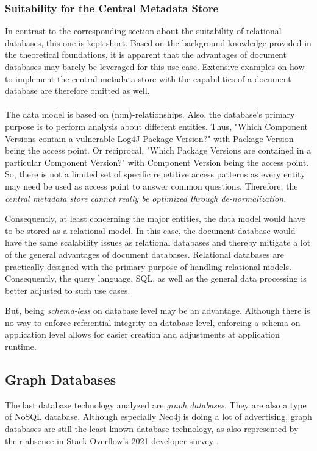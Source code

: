 \subsubsection{Suitability for the Central Metadata Store}
In contrast to the corresponding section about the suitability of relational databases, this one is kept short. Based on the background knowledge provided in the theoretical foundations, it is apparent that the advantages of document databases may barely be leveraged for this use case. Extensive examples on how to implement the central metadata store with the capabilities of a document database are therefore omitted as well.\\\\ 
The data model is based on (n:m)-relationships. Also, the database's primary purpose is to perform analysis about different entities. Thus, "Which Component Versions contain a vulnerable Log4J %
Package Version?" with Package Version being the access point. Or reciprocal, "Which Package Versions are contained in a particular Component Version?" with Component Version being the access point. So, there is not a limited set of specific repetitive access patterns as every entity may need be used as access point to answer common questions. Therefore, the \emph{central metadata store cannot really be optimized through de-normalization}.\par
Consequently, at least concerning the major entities, the data model would have to be stored as a relational model. In this case, the document database would have the same scalability issues as relational databases and thereby mitigate a lot of the general advantages of document databases. Relational databases are practically designed with the primary purpose of handling relational models. Consequently, the query language, SQL, as well as the general data processing is better adjusted to such use cases.\par 
But, being \emph{schema-less} on database level may be an advantage. Although there is no way to enforce referential integrity on database level, enforcing a schema on application level allows for easier creation and adjustments at application runtime.

\subsection{Graph Databases}
The last database technology analyzed are \emph{graph databases}. They are also a type of NoSQL database. Although especially Neo4j is doing a lot of advertising, graph databases are still the least known database technology, as also represented by their absence in Stack Overflow's 2021 developer survey \cite{StackoverflowDeveloperSurvey}.

